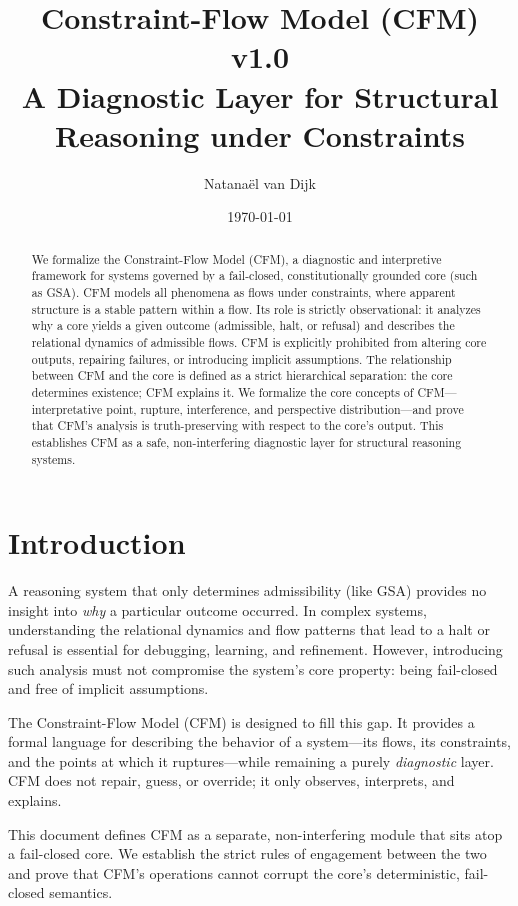 \documentclass{article}
\title{Constraint-Flow Model (CFM) v1.0\\
\large A Diagnostic Layer for Structural Reasoning under Constraints}
\author{Natanaël van Dijk}
\date{\today}
\begin{document}
\maketitle

\begin{abstract}
We formalize the Constraint-Flow Model (CFM), a diagnostic and interpretive framework for systems governed by a fail-closed, constitutionally grounded core (such as GSA). CFM models all phenomena as flows under constraints, where apparent structure is a stable pattern within a flow. Its role is strictly observational: it analyzes why a core yields a given outcome (admissible, halt, or refusal) and describes the relational dynamics of admissible flows. CFM is explicitly prohibited from altering core outputs, repairing failures, or introducing implicit assumptions. The relationship between CFM and the core is defined as a strict hierarchical separation: the core determines existence; CFM explains it. We formalize the core concepts of CFM---interpretative point, rupture, interference, and perspective distribution---and prove that CFM's analysis is truth-preserving with respect to the core's output. This establishes CFM as a safe, non-interfering diagnostic layer for structural reasoning systems.
\end{abstract}

\section{Introduction}

A reasoning system that only determines admissibility (like GSA) provides no insight into \emph{why} a particular outcome occurred. In complex systems, understanding the relational dynamics and flow patterns that lead to a halt or refusal is essential for debugging, learning, and refinement. However, introducing such analysis must not compromise the system's core property: being fail-closed and free of implicit assumptions.

The Constraint-Flow Model (CFM) is designed to fill this gap. It provides a formal language for describing the behavior of a system---its flows, its constraints, and the points at which it ruptures---while remaining a purely \emph{diagnostic} layer. CFM does not repair, guess, or override; it only observes, interprets, and explains.

This document defines CFM as a separate, non-interfering module that sits atop a fail-closed core. We establish the strict rules of engagement between the two and prove that CFM's operations cannot corrupt the core's deterministic, fail-closed semantics.
\end{document}
